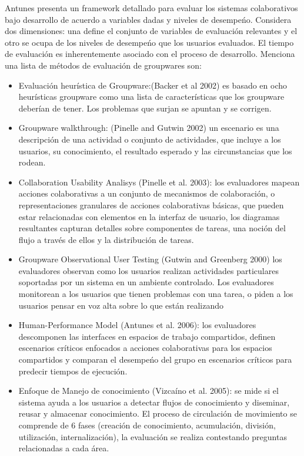 Antunes\cite{antunes2008structuring} presenta un framework detallado para evaluar los sistemas colaborativos bajo desarrollo de acuerdo a variables dadas y niveles de desempe\'no. Considera dos dimensiones: una define el conjunto de variables de evaluaci\'on relevantes y el otro se ocupa de los niveles de desempe\'no que los usuarios evaluados. El tiempo de evaluaci\'on es inherentemente asociado con el proceso de desarrollo. Menciona una lista de m\'etodos de evaluaci\'on de groupwares son: 
\begin{itemize}
\item Evaluaci\'on heur\'istica de Groupware:(Backer et al 2002) es basado en ocho heur\'isticas groupware como una lista de caracter\'isticas que los groupware deber\'ian de tener. Los problemas que surjan se apuntan y se corrigen.
\item Groupware walkthrough: (Pinelle and Gutwin 2002) un escenario es una descripci\'on de una actividad o conjunto de actividades, que incluye a los usuarios, su conocimiento, el resultado esperado y las circunstancias que los rodean.
\item Collaboration Usability Analisys (Pinelle et al. 2003): los evaluadores mapean acciones colaborativas a un conjunto de mecanismos de colaboraci\'on, o representaciones granulares de acciones colaborativas b\'asicas, que pueden estar relacionadas con elementos en la interfaz de usuario, los diagramas resultantes capturan detalles sobre componentes de tareas, una noci\'on del flujo a trav\'es de ellos y la distribuci\'on de tareas.
\item Groupware Observational User Testing (Gutwin and Greenberg 2000) los evaluadores observan como los usuarios realizan actividades particulares soportadas por un sistema en un ambiente controlado. Los evaluadores monitorean a los usuarios que tienen problemas con una tarea, o piden a los usuarios pensar en voz alta sobre lo que est\'an realizando
\item Human-Performance Model (Antunes et al. 2006): los evaluadores descomponen las interfaces en espacios de trabajo compartidos, definen escenarios cr\'iticos enfocados a acciones colaborativas para los espacios compartidos y comparan el desempe\'no del grupo en escenarios cr\'iticos para predecir tiempos de ejecuci\'on.
\item Enfoque de Manejo de conocimiento (Vizca\'ino et al. 2005): se mide si el sistema ayuda a los usuarios a detectar flujos de conocimiento y diseminar, reusar y almacenar conocimiento. El proceso de circulaci\'on de movimiento se comprende de 6 fases (creaci\'on de conocimiento, acumulaci\'on, divisi\'on, utilizaci\'on, internalizaci\'on), la evaluaci\'on se realiza contestando preguntas relacionadas a cada \'area.
\end{itemize}
